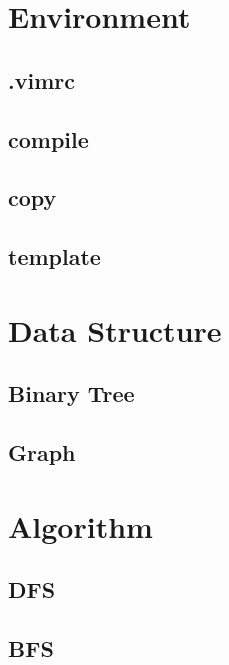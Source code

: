 \documentclass[a4paper, landscape, 8pt]{article}
\begin{document}
\begin{multicols*}{3}
\maketitle
\tableofcontents

\section{Environment}
\subsection{.vimrc}

\subsection{compile}

\subsection{copy}

\subsection{template}


\section{Data Structure}
\subsection{Binary Tree}

\subsection{Graph}


\section{Algorithm}
\subsection{DFS}

\subsection{BFS}


\end{multicols*}
\end{document}
